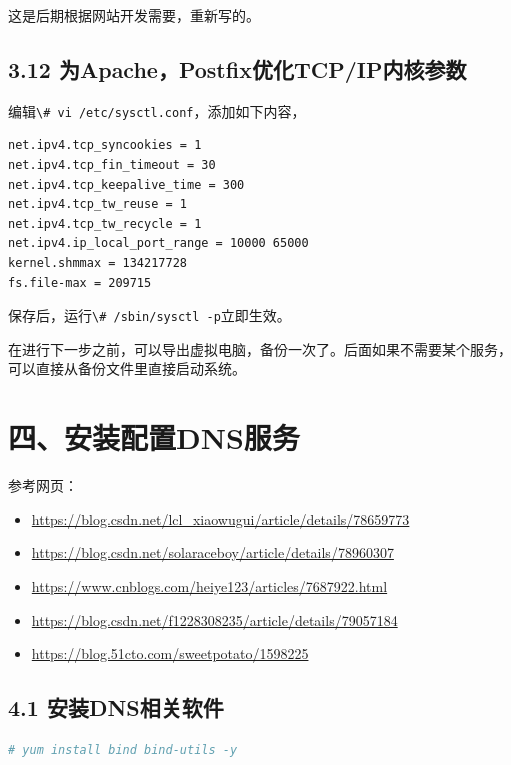\documentclass[doctor,openright,twoside]{sjtuthesis}
\providecommand{\tightlist}{%
    \setlength{\itemsep}{0pt}\setlength{\parskip}{0pt}}
\newcommand{\passthrough}[1]{#1}
\theoremstyle{plain}
\theoremstyle{definition}
\theoremstyle{remark}
\theoremstyle{ocrenumbox}
\theoremstyle{plain}
\begin{document}
这是后期根据网站开发需要，重新写的。

\hypertarget{apachepostfixtcpip}{%
\subsection{3.12 为Apache，Postfix优化TCP/IP内核参数}\label{apachepostfixtcpip}}

编辑\passthrough{\lstinline!\# vi /etc/sysctl.conf!}，添加如下内容，

\begin{lstlisting}
net.ipv4.tcp_syncookies = 1
net.ipv4.tcp_fin_timeout = 30
net.ipv4.tcp_keepalive_time = 300
net.ipv4.tcp_tw_reuse = 1
net.ipv4.tcp_tw_recycle = 1
net.ipv4.ip_local_port_range = 10000 65000
kernel.shmmax = 134217728
fs.file-max = 209715
\end{lstlisting}

保存后，运行\passthrough{\lstinline!\# /sbin/sysctl -p!}立即生效。

在进行下一步之前，可以导出虚拟电脑，备份一次了。后面如果不需要某个服务，可以直接从备份文件里直接启动系统。

\hypertarget{dns}{%
\section{四、安装配置DNS服务}\label{dns}}

参考网页：

\begin{itemize}
\tightlist
\item
  \url{https://blog.csdn.net/lcl_xiaowugui/article/details/78659773}
\item
  \url{https://blog.csdn.net/solaraceboy/article/details/78960307}
\item
  \url{https://www.cnblogs.com/heiye123/articles/7687922.html}
\item
  \url{https://blog.csdn.net/f1228308235/article/details/79057184}
\item
  \url{https://blog.51cto.com/sweetpotato/1598225}
\end{itemize}

\hypertarget{dns-1}{%
\subsection{4.1 安装DNS相关软件}\label{dns-1}}

\begin{lstlisting}[language=bash]
# yum install bind bind-utils -y
\end{lstlisting}
\end{document}
